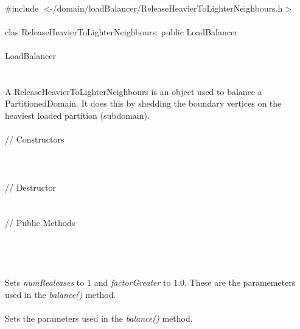 
   \\
\indent \#include $<\tilde{
}$/domain/loadBalancer/ReleaseHeavierToLighterNeighbours.h$>$  \\ 

  \\
\indent clas ReleaseHeavierToLighterNeighbours: public LoadBalancer \\

 \\
\indent  LoadBalancer \\
\indent{} \\


  \\
\indent A ReleaseHeavierToLighterNeighbours is an object used to balance a
PartitionedDomain. It does this by shedding the boundary vertices on
the heaviest loaded partition (subdomain). \\

  \\
\indent\indent  // Constructors  \\
\indent{}\\ 
\indent{} \\ \\ 
\indent\indent // Destructor  \\
\indent{}\\\\
\indent\indent // Public Methods  \\
\indent{} \\ \\


\\
\\ 
Sets {\em numRealeases} to $1$ and {\em factorGreater} to $1.0$. These
are the paramemeters used in the {\em balance()} method. \\

 \\ 
Sets the parameters used in the {\em balance()} method. \\

